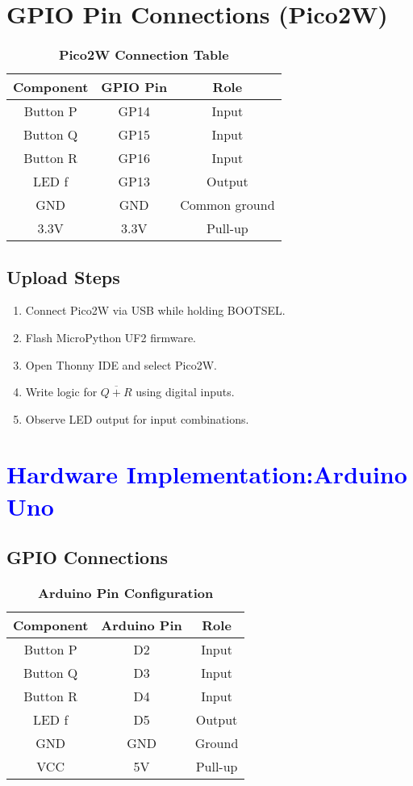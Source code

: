 \documentclass[twocolumn]{article}
\begin{document}
\vspace{7em}
\section*{GPIO Pin Connections (Pico2W)}

\begin{table}[h]
\centering
\renewcommand{\arraystretch}{1.2}
\begin{tabular}{|c|c|c|}
\hline
Component & GPIO Pin & Role \\
\hline
Button P & GP14 & Input \\
Button Q & GP15 & Input \\
Button R & GP16 & Input \\
LED f    & GP13 & Output \\
GND      & GND  & Common ground \\
3.3V     & 3.3V & Pull-up \\
\hline
\end{tabular}
\caption*{\textbf{Pico2W Connection Table}}
\end{table}

\subsection*{Upload Steps}
\begin{enumerate}
    \item Connect Pico2W via USB while holding BOOTSEL.
    \item Flash MicroPython UF2 firmware.
    \item Open Thonny IDE and select Pico2W.
    \item Write logic for $\overline{Q + R}$ using digital inputs.
    \item Observe LED output for input combinations.
\end{enumerate}

\section*{\textcolor{blue}{Hardware Implementation:Arduino Uno}}

\subsection*{GPIO Connections}

\begin{table}[h]
\centering
\renewcommand{\arraystretch}{1.2}
\begin{tabular}{|c|c|c|}
\hline
Component & Arduino Pin & Role \\
\hline
Button P & D2 & Input \\
Button Q & D3 & Input \\
Button R & D4 & Input \\
LED f    & D5 & Output \\
GND      & GND & Ground \\
VCC      & 5V & Pull-up \\
\hline
\end{tabular}
\caption*{\textbf{Arduino Pin Configuration}}
\end{table}
\end{document}
